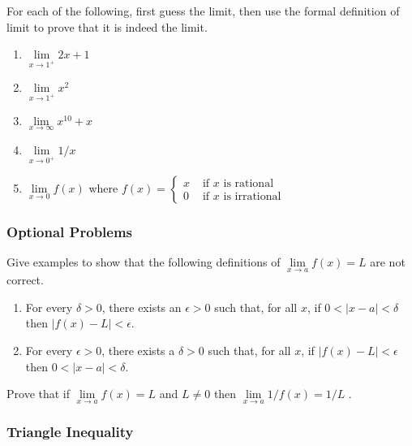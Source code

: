 \begin{exercise}
	For each of the following, first guess the limit, then use the formal definition of limit to prove that it is indeed the limit.
	\begin{enumerate}
		\item $\lim \limits_{x \rightarrow 1^+} 2x + 1$
		\item $\lim \limits_{x \rightarrow 1^+} x^2$
		\item $\lim \limits_{x \rightarrow \infty} x^{10} + x$
		\item $\lim \limits_{x \rightarrow 0^+} 1/x$
		\item $\lim \limits_{x \rightarrow 0} f(x)$ where $f(x) = \begin{cases}
				      x & \mbox{ if $x$ is rational}   \\
				      0 & \mbox{ if $x$ is irrational}
			      \end{cases}$
	\end{enumerate}
\end{exercise}

\subsubsection*{Optional Problems}

\begin{exercise} Give examples to show that the following definitions of $\lim \limits _ {x \rightarrow a} f(x) = L$ are not correct.
	\begin{enumerate}
		\item For every $ \delta > 0$, there exists an $ \epsilon > 0$ such that, for all $x$, if $ 0<|x-a|< \delta$ then $ |f(x) - L|< \epsilon$.
		\item For every $\epsilon > 0$, there exists a $\delta > 0$ such that, for all $x$, if $|f(x) - L| < \epsilon$ then $0 < |x - a| < \delta$.
	\end{enumerate}
\end{exercise}

\begin{exercise}
	Prove that if $\lim \limits _ {x \rightarrow a} f(x) = L$ and $ L \neq 0$ then $\lim \limits _ {x \rightarrow a} 1/f(x) = 1/L$ .
\end{exercise}



\subsubsection{Triangle Inequality}


